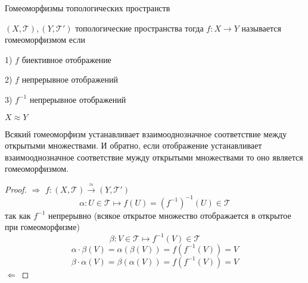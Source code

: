 \begin{title}[\Large]
  Гомеоморфизмы топологических пространств
\end{title}

\begin{define}[гомеоморфизма]
  $(X, \mathcal{T}), (Y, \mathcal{T}')$ топологические пространства тогда
  $f: X \to Y$ называется гомеоморфизмом если

  1) $f$ биективное отображение

  2) $f$ непрерывное отображений

  3) $f^{-1}$ непрерывное отображений

  $X \approx Y$
\end{define}

\begin{theorem}
  Всякий гомеоморфизм устанавливает взаимооднозначное соответствие между
  открытыми множествами. И обратно, если отображение устанавливает
  взаимооднозначное соответствие мужду открытыми множествами то оно является
  гомеоморфизмом.
\end{theorem}

\begin{proof}
  $\Rightarrow$ $f:(X, \mathcal{T}) \stackrel{\approx}{\to} (Y, \mathcal{T}')$
  $$
  \alpha : U \in \mathcal{T} \mapsto f(U) = (f^{-1})^{-1}(U) \in \mathcal{T}
  $$
  так как $f^{-1}$ непрерывно (всякое открытое множество отображается в открытое
  при гомеоморфизме)
  $$
  \beta : V \in \mathcal{T} \mapsto f^{-1}(V) \in \mathcal{T}
  $$
  $$
  \alpha \cdot \beta (V) = \alpha(\beta(V)) = f(f^{-1}(V)) = V
  $$
  $$
  \beta \cdot \alpha (V) = \beta(\alpha(V)) = f(f^{-1}(V)) = V
  $$
  $\Leftarrow$
\end{proof}
